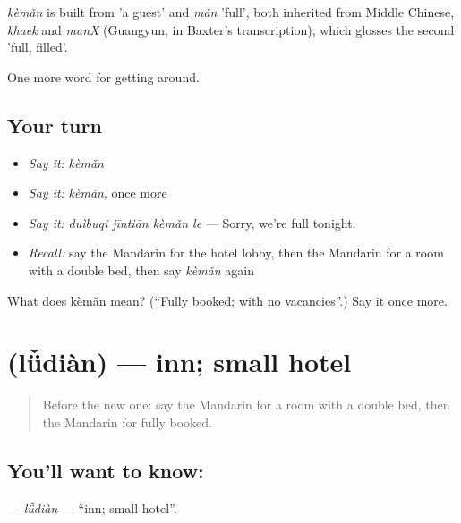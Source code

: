 \begin{cousinweb}
\emph{kèmǎn} is built from  'a guest' and \emph{mǎn} 'full', both inherited from Middle Chinese, \emph{khaek} and \emph{manX} (Guangyun, in Baxter's transcription), which glosses the second 'full, filled'.
\end{cousinweb}

\begin{grammarlens}[title={What you've built}]
One more word for getting around.
\end{grammarlens}

\subsection*{Your turn}
\begin{itemize}
\raggedright
  \item \emph{Say it:} \emph{kèmǎn}
  \item \emph{Say it:} \emph{kèmǎn}, once more
  \item \emph{Say it:} \emph{duìbuqǐ jīntiān kèmǎn le} — Sorry, we're full tonight.
  \item \emph{Recall:} say the Mandarin for the hotel lobby, then the Mandarin for a room with a double bed, then say \emph{kèmǎn} again
\end{itemize}

\begin{tcolorbox}[breakable,colback=teal!4,colframe=teal!35!black,title={Before you move on}]
What does kèmǎn mean? (\textquotedblleft{}Fully booked; with no vacancies\textquotedblright{}.) Say it once more.
\end{tcolorbox}
\section[\texorpdfstring{\zh{旅店} (lǚdiàn)}{旅店 (lǚdiàn)}]{ (lǚdiàn) — inn; small hotel}

\label{lesson:ZH-C426-ludian}



\begin{quote}
Before the new one: say the Mandarin for a room with a double bed, then the Mandarin for fully booked.
\end{quote}

\subsection*{You'll want to know: }
\textbf{} — \emph{lǚdiàn} — \textquotedblleft{}inn; small hotel\textquotedblright{}.

